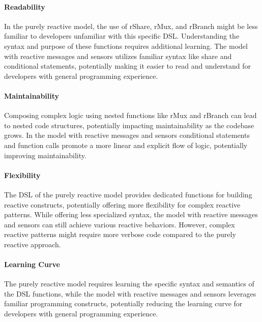 \paragraph{Readability}

In the purely reactive model, the use of rShare, rMux, and rBranch might be less familiar to developers unfamiliar with this specific DSL. Understanding the syntax and purpose of these functions requires additional learning. The model with reactive messages and sensors utilizes familiar syntax like share and conditional statements, potentially making it easier to read and understand for developers with general programming experience.

\paragraph{Maintainability}

Composing complex logic using nested functions like rMux and rBranch can lead to nested code structures, potentially impacting maintainability as the codebase grows. In the model with reactive messages and sensors conditional statements and function calls promote a more linear and explicit flow of logic, potentially improving maintainability.

\paragraph{Flexibility}

The DSL of the purely reactive model provides dedicated functions for building reactive constructs, potentially offering more flexibility for complex reactive patterns. While offering less specialized syntax, the model with reactive messages and sensors can still achieve various reactive behaviors. However, complex reactive patterns might require more verbose code compared to the purely reactive approach.

\paragraph{Learning Curve}

The purely reactive model requires learning the specific syntax and semantics of the DSL functions, while the model with reactive messages and sensors leverages familiar programming constructs, potentially reducing the learning curve for developers with general programming experience.

